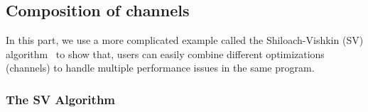 \documentclass{sokendai_thesis} %
\begin{document}

\subsection{Composition of channels}
\label{sec:sv-algo}


In this part, we use a more complicated example called the Shiloach-Vishkin (SV) algorithm~\cite{ShVi82} to show that,
users can easily combine different optimizations (channels) to handle multiple performance issues in the same program.

\subsubsection{The SV Algorithm}

\end{document}
